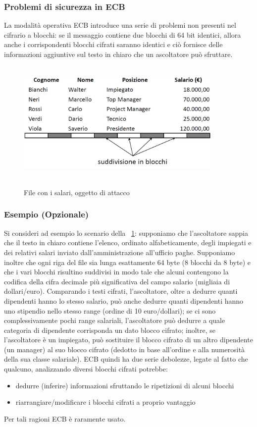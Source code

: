 \subsubsection{Problemi di sicurezza in ECB}
La modalità operativa ECB introduce una serie di problemi non presenti nel cifrario a blocchi: se il messaggio contiene due blocchi di 64 bit identici, allora anche i corrispondenti blocchi cifrati saranno identici e ciò fornisce delle informazioni aggiuntive sul testo in chiaro che un ascoltatore può sfruttare.
\begin{figure}
\centering%
	\subfigure%
	{\includegraphics[height=6cm, width=10cm, keepaspectratio]{Immagini/modalita_operative/File_salari.png}}
	\caption{File con i salari, oggetto di attacco \label{fig:File_salari}} 	
\end{figure}
\subsubsection{Esempio (Opzionale)}
Si consideri ad esempio lo scenario della \figurename ~\ref{fig:File_salari}: supponiamo che l'ascoltatore sappia che il testo in chiaro contiene l'elenco, ordinato alfabeticamente, degli impiegati e dei relativi salari inviato dall'amministrazione all'ufficio paghe. Supponiamo inoltre che ogni riga del file sia lunga esattamente 64 byte (8 blocchi da 8 byte) e che i vari blocchi risultino suddivisi in modo tale che alcuni contengono la codifica della cifra decimale più significativa del campo salario (migliaia di dollari/euro). Comparando i testi cifrati, l'ascoltatore, oltre a dedurre quanti dipendenti hanno lo stesso salario, può anche dedurre quanti dipendenti hanno uno stipendio nello stesso range (ordine di 10 euro/dollari); se ci sono complessivamente pochi range salariali, l'ascoltatore può dedurre a quale categoria di dipendente corrisponda un dato blocco cifrato; inoltre, se l'ascoltatore è un impiegato, può sostituire il blocco cifrato di un altro dipendente (un manager) al suo blocco cifrato (dedotto in base all'ordine e alla
numerosità della sua classe salariale).\newline \newline
ECB quindi ha due serie debolezze, legate al fatto che qualcuno, analizzando diversi blocchi cifrati potrebbe:
\begin{itemize}
\item dedurre (inferire) informazioni sfruttando le ripetizioni di alcuni blocchi
\item riarrangiare/modificare i blocchi cifrati a proprio vantaggio
\end{itemize}
Per tali ragioni ECB è raramente usato.
